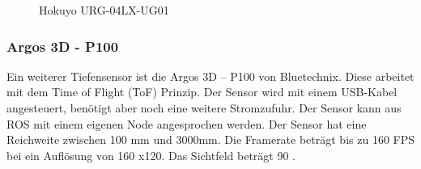  \begin{figure}[H]
 	\centering
 	\caption{Hokuyo URG-04LX-UG01}
 	\label{fig:aufbau-hok}
 \end{figure}

\subsubsection{Argos 3D - P100}
Ein weiterer Tiefensensor ist die Argos 3D – P100 von Bluetechnix. Diese arbeitet mit dem Time of Flight (ToF) Prinzip. Der Sensor wird mit einem USB-Kabel angesteuert, benötigt aber noch eine weitere Stromzufuhr. Der Sensor kann aus ROS mit einem eigenen Node angesprochen werden. Der Sensor hat eine Reichweite zwischen 100 mm und 3000mm. Die Framerate beträgt bis zu 160 FPS bei ein Auflösung von 160 x120. Das Sichtfeld beträgt 90 \textdegree.\citep{bluetechnix2015}

